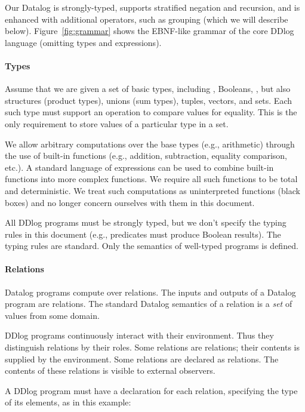 Our Datalog is strongly-typed, supports stratified negation and recursion, and
is enhanced with additional operators, such as grouping (which we will describe below).
Figure~\ref{fig:grammar} shows the EBNF-like grammar of the core DDlog language
(omitting types and expressions).

\paragraph{Types}

Assume that we are given a set of basic types, including , Booleans, ,
but also structures (product types), unions (sum types), tuples, vectors, and sets.
Each such type must support an operation to compare values for equality.  This is the only
requirement to store values of a particular type in a set.

We allow arbitrary computations over the base types (e.g., arithmetic) through the use of
built-in functions (e.g., addition, subtraction, equality comparison, etc.).  A standard
language of expressions can be used to combine built-in functions into more complex
functions.  We require all such functions to be total and deterministic.
We treat such computations as uninterpreted functions (black boxes) and no longer
concern ourselves with them in this document.

All DDlog programs must be strongly typed, but we don't specify the typing rules in
this document (e.g., predicates must produce Boolean results).
The typing rules are standard.  Only the semantics of well-typed
programs is defined.

\paragraph{Relations}

Datalog programs compute over relations.  The inputs and outputs of a Datalog
program are relations.  The standard Datalog semantics of
a relation is a \emph{set} of values from some domain.

DDlog programs continuously interact with their environment.  Thus they
distinguish relations by their roles.  Some relations are  relations;
their contents is supplied by the environment.  Some relations
are declared as  relations.  The contents of these relations is visible
to external observers.

A DDlog program must have a declaration for each relation, specifying
the type of its elements, as in this example:


